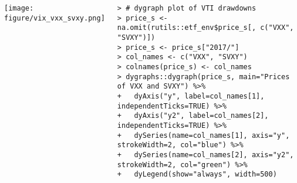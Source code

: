 \documentclass[10pt]{beamer}\usepackage[]{graphicx}\usepackage[]{color}
\makeatletter
\newenvironment{kframe}{%
 \def\at@end@of@kframe{}%
 \ifinner\ifhmode%
  \def\at@end@of@kframe{\end{minipage}}%
  \begin{minipage}{\columnwidth}%
 \fi\fi%
 \def\FrameCommand##1{\hskip\@totalleftmargin \hskip-\fboxsep
 \colorbox{shadecolor}{##1}\hskip-\fboxsep
     \hskip-\linewidth \hskip-\@totalleftmargin \hskip\columnwidth}%
 \MakeFramed {\advance\hsize-\width
   \@totalleftmargin\z@ \linewidth\hsize
   \@setminipage}}%
 {\par\unskip\endMakeFramed%
 \at@end@of@kframe}
\newenvironment{knitrout}{}{} %
\makeatother
\begin{document}
\begin{frame}[fragile,t]{\subsecname}
\begin{block}{}
\begin{columns}[T]
\begin{knitrout}
\end{knitrout}
      \texttt{[image: figure/vix\_vxx\_svxy.png]}
\begin{knitrout}\tiny
{}\color{fgcolor}\begin{kframe}
\begin{verbatim}
> # dygraph plot of VTI drawdowns
> price_s <- na.omit(rutils::etf_env$price_s[, c("VXX", "SVXY")])
> price_s <- price_s["2017/"]
> col_names <- c("VXX", "SVXY")
> colnames(price_s) <- col_names
> dygraphs::dygraph(price_s, main="Prices of VXX and SVXY") %>%
+   dyAxis("y", label=col_names[1], independentTicks=TRUE) %>%
+   dyAxis("y2", label=col_names[2], independentTicks=TRUE) %>%
+   dySeries(name=col_names[1], axis="y", strokeWidth=2, col="blue") %>%
+   dySeries(name=col_names[2], axis="y2", strokeWidth=2, col="green") %>%
+   dyLegend(show="always", width=500)
\end{verbatim}
\end{kframe}
\end{knitrout}
  \end{columns}
\end{block}

\end{frame}


\end{document}

